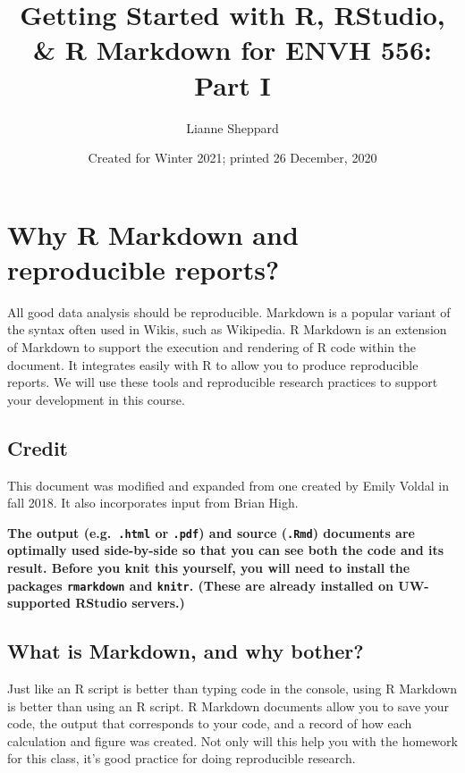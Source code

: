 \documentclass[
]{article}
\title{Getting Started with R, RStudio, \& R Markdown for ENVH 556: Part I}
\author{Lianne Sheppard}
\date{Created for Winter 2021; printed 26 December, 2020}
\begin{document}
\maketitle

{
\hypersetup{linkcolor=}
\setcounter{tocdepth}{3}
\tableofcontents
}
\hypertarget{why-r-markdown-and-reproducible-reports}{%
\section{Why R Markdown and reproducible
reports?}\label{why-r-markdown-and-reproducible-reports}}

All good data analysis should be reproducible. Markdown is a popular
variant of the syntax often used in Wikis, such as Wikipedia. R Markdown
is an extension of Markdown to support the execution and rendering of R
code within the document. It integrates easily with R to allow you to
produce reproducible reports. We will use these tools and reproducible
research practices to support your development in this course.

\hypertarget{credit}{%
\subsection{Credit}\label{credit}}

This document was modified and expanded from one created by Emily Voldal
in fall 2018. It also incorporates input from Brian High.

\textbf{The output (e.g.~\texttt{.html} or \texttt{.pdf}) and source
(\texttt{.Rmd}) documents are optimally used side-by-side so that you
can see both the code and its result. Before you knit this yourself, you
will need to install the packages \texttt{rmarkdown} and \texttt{knitr}.
(These are already installed on UW-supported RStudio servers.)}

\hypertarget{what-is-markdown-and-why-bother}{%
\subsection{What is Markdown, and why
bother?}\label{what-is-markdown-and-why-bother}}

Just like an R script is better than typing code in the console, using R
Markdown is better than using an R script. R Markdown documents allow
you to save your code, the output that corresponds to your code, and a
record of how each calculation and figure was created. Not only will
this help you with the homework for this class, it's good practice for
doing reproducible research.
\end{document}
